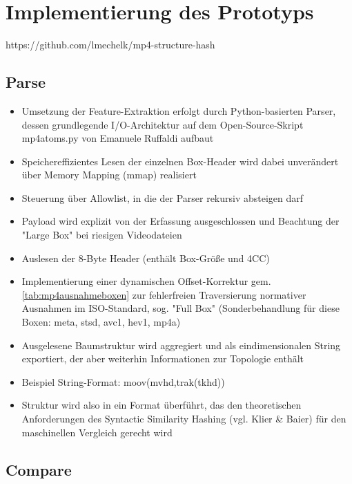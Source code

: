 


\section{Implementierung des Prototyps}

https://github.com/lmechelk/mp4-structure-hash

\subsection{Parse}

\begin{itemize}
    \item Umsetzung der Feature-Extraktion erfolgt durch Python-basierten Parser, dessen grundlegende I/O-Architektur auf dem Open-Source-Skript mp4atoms.py von Emanuele Ruffaldi aufbaut \cite{emanuele_ruffaldi_dump_2024}
    \item Speichereffizientes Lesen der einzelnen Box-Header wird dabei unverändert über Memory Mapping (mmap) realisiert
    \item Steuerung über Allowlist, in die der Parser rekursiv absteigen darf
    \item Payload wird explizit von der Erfassung ausgeschlossen und Beachtung der "Large Box" bei riesigen Videodateien \cite[Kap. 4.2]{iso_14496-12_2022}
    \item Auslesen der 8-Byte Header (enthält Box-Größe und 4CC)
    \item Implementierung einer dynamischen Offset-Korrektur gem. \cref{tab:mp4ausnahmeboxen} zur fehlerfreien Traversierung normativer Ausnahmen im ISO-Standard, sog. "Full Box" (Sonderbehandlung für diese Boxen: meta, stsd, avc1, hev1, mp4a)
    \item Ausgelesene Baumstruktur wird aggregiert und als eindimensionalen String exportiert, der aber weiterhin Informationen zur Topologie enthält
    \item Beispiel String-Format: moov(mvhd,trak(tkhd))
    \item Struktur wird also in ein Format überführt, das den theoretischen Anforderungen des Syntactic Similarity Hashing (vgl. Klier \& Baier\cite{klier_github_2025}) für den maschinellen Vergleich gerecht wird
\end{itemize}



\subsection{Compare}

